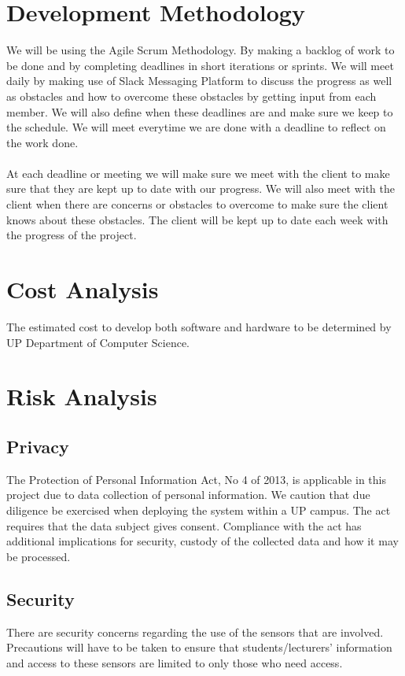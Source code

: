 \documentclass{article}
\begin{document}
\section{Development Methodology}
We will be using the Agile Scrum Methodology. By making a backlog of work to be done and by completing deadlines in short iterations or sprints. We will meet daily by making use of  Slack Messaging Platform to discuss the progress as well as obstacles and how to overcome these obstacles by getting input from each member. We will also define when these deadlines are and make sure we keep to the schedule. We will meet everytime we are done with a deadline to reflect on the work done. \\ \\
At each deadline or meeting we will make sure we meet with the client to make sure that they are kept up to date with our progress. We will also meet with the client when there are concerns or obstacles to overcome to make sure the client knows about these obstacles. The client will be kept up to date each week with the progress of the project.
\section{Cost Analysis}
The estimated cost to develop both software and hardware to be determined by UP Department of Computer Science.

\section{Risk Analysis}
\subsection{Privacy}
The Protection of Personal Information Act, No 4 of 2013, is applicable in this project due to data collection of personal information. We caution that due diligence be exercised when deploying the system within a UP campus. The act requires that the data subject gives consent. Compliance with the act has additional implications for security, custody of the collected data and how it may be processed.

\subsection{Security}
There are security concerns regarding the use of  the sensors that are involved. Precautions will have to be taken to ensure that students/lecturers' information and access to these sensors are limited to only those who need access.
\end{document}

